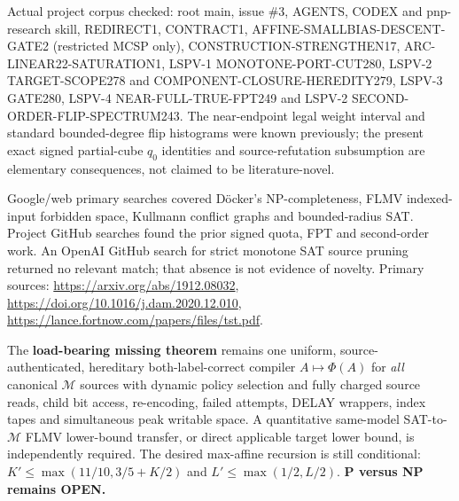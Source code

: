 \documentclass[11pt]{article}
\begin{document}
Actual project corpus checked: root main, issue \#3, AGENTS,
CODEX and pnp-research skill, REDIRECT1, CONTRACT1,
AFFINE-SMALLBIAS-DESCENT-GATE2 (restricted MCSP only),
CONSTRUCTION-STRENGTHEN17, ARC-LINEAR22-SATURATION1,
LSPV-1 MONOTONE-PORT-CUT280, LSPV-2 TARGET-SCOPE278 and
COMPONENT-CLOSURE-HEREDITY279, LSPV-3 GATE280,
LSPV-4 NEAR-FULL-TRUE-FPT249 and LSPV-2
SECOND-ORDER-FLIP-SPECTRUM243.
The near-endpoint legal weight interval and standard
bounded-degree flip histograms were known previously;
the present exact signed partial-cube $q_0$ identities
and source-refutation subsumption are elementary
consequences, not claimed to be literature-novel.

Google/web primary searches covered D\"ocker's NP-completeness,
FLMV indexed-input forbidden space, Kullmann conflict graphs
and bounded-radius SAT. Project GitHub searches found
the prior signed quota, FPT and second-order work.
An OpenAI GitHub search for strict monotone SAT source
pruning returned no relevant match; that absence is
not evidence of novelty. Primary sources:
\url{https://arxiv.org/abs/1912.08032},
\url{https://doi.org/10.1016/j.dam.2020.12.010},
\url{https://lance.fortnow.com/papers/files/tst.pdf}.

The \textbf{load-bearing missing theorem} remains one
uniform, source-authenticated, hereditary
both-label-correct compiler $A\mapsto\Phi(A)$ for
\emph{all} canonical $\mathcal M$ sources with dynamic
policy selection and fully charged source reads,
child bit access, re-encoding, failed attempts,
DELAY wrappers, index tapes and simultaneous peak
writable space. A quantitative same-model SAT-to-$\mathcal M$
FLMV lower-bound transfer, or direct applicable
target lower bound, is independently required.
The desired max-affine recursion is still conditional:
$K'\le\max(11/10,3/5+K/2)$ and
$L'\le\max(1/2,L/2)$. \textbf{P versus NP remains OPEN.}
\end{document}
